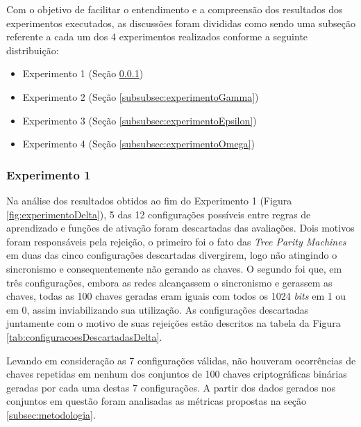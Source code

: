 \documentclass[a4paper,10pt,oneside,conference,final,keeplastbox]{inatel}
\newcommand{\bits}{\textit{bits}\xspace}
\begin{document}
            Com o objetivo de facilitar o entendimento e a compreensão dos resultados dos experimentos executados, as discussões foram divididas como sendo uma subseção referente a cada um dos 4 experimentos realizados conforme a seguinte distribuição:

            \begin{itemize}
                \item Experimento 1 (Seção \ref{subsubsec:experimentoDelta})
                \item Experimento 2 (Seção \ref{subsubsec:experimentoGamma})
                \item Experimento 3 (Seção \ref{subsubsec:experimentoEpsilon})
                \item Experimento 4 (Seção \ref{subsubsec:experimentoOmega})
            \end{itemize}

            \subsubsection{Experimento 1}
            \label{subsubsec:experimentoDelta}

                Na análise dos resultados obtidos ao fim do Experimento 1 (Figura \ref{fig:experimentoDelta}), 5 das 12 configurações possíveis entre regras de aprendizado e funções de ativação foram descartadas das avaliações. Dois motivos foram responsáveis pela rejeição, o primeiro foi o fato das \textit{Tree Parity Machines} em duas das cinco configurações descartadas divergirem, logo não atingindo o sincronismo e consequentemente não gerando as chaves. O segundo foi que, em três configurações, embora as redes alcançassem o sincronismo e gerassem as chaves, todas as 100 chaves geradas eram iguais com todos os 1024 \bits em 1 ou em 0, assim inviabilizando sua utilização. As configurações descartadas juntamente com o motivo de suas rejeições estão descritos na tabela da Figura \ref{tab:configuracoesDescartadasDelta}.

                
            
                Levando em consideração as 7 configurações válidas, não houveram ocorrências de chaves repetidas em nenhum dos conjuntos de 100 chaves criptográficas binárias geradas por cada uma destas 7 configurações. A partir dos dados gerados nos conjuntos em questão foram analisadas as métricas propostas na seção \ref{subsec:metodologia}.
                
\end{document}

